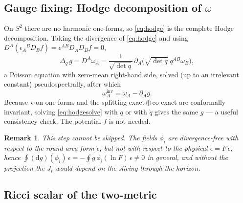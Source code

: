 \documentclass[11pt]{article}
\newtheorem{remark}{Remark}
\newcommand{\dd}{\mathrm{d}}
\newcommand{\qo}{\mathring{q}}          %
\newcommand{\epso}{\mathring{\epsilon}} %
\begin{document}
\subsection{Gauge fixing: Hodge decomposition of \texorpdfstring{$\omega$}{omega}}
\label{sec:hodge}

On $S^2$ there are no harmonic one-forms, so \eqref{eq:hodge} is the complete
Hodge decomposition.  Taking the divergence of \eqref{eq:hodge} and using
$D^A(\epsilon_A{}^B D_B f) = \epsilon^{AB} D_A D_B f = 0$,
\begin{equation}
  \Delta_q\, g = D^A \omega_A
  = \frac{1}{\sqrt{\det q}}\,\partial_A
    \bigl(\sqrt{\det q}\; q^{AB} \omega_B\bigr),
  \label{eq:hodgesolve}
\end{equation}
a Poisson equation with zero-mean right-hand side, solved (up to an
irrelevant constant) pseudospectrally, after which
\begin{equation}
  \omega^{\mathrm{inv}}_A = \omega_A - \partial_A g .
\end{equation}
Because $\star$ on one-forms and the splitting
exact\,$\oplus$\,co-exact are conformally invariant, solving
\eqref{eq:hodgesolve} with $q$ or with $\qo$ gives the same $g$ --- a useful
consistency check.  The potential $f$ is not needed.

\begin{remark}
This step cannot be skipped.  The fields $\phi_i$ are divergence-free with
respect to the \emph{round} area form $\epso$, but not with respect to the
physical $\epsilon = F\,\epso$; hence
$\oint (\dd g)(\phi_i)\,\epsilon = -\oint g\,\phi_i(\ln F)\,\epsilon \ne 0$
in general, and without the projection the $J_i$ would depend on the slicing
through the horizon.
\end{remark}

\subsection{Ricci scalar of the two-metric}
\label{sec:ricciscalar}
\end{document}
